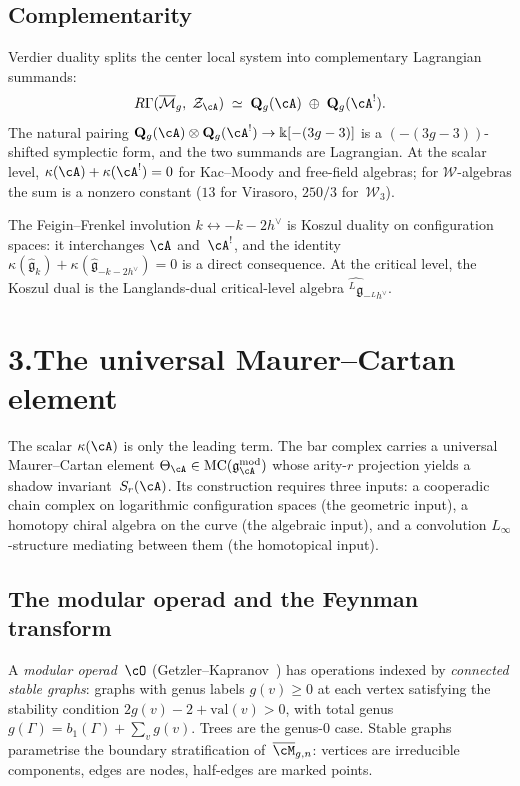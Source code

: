 \subsection*{Complementarity}

Verdier duality splits the center local system into complementary
Lagrangian summands:
\[
R\Gamma(\overline{\mathcal M}_g,\;\mathcal Z_\cA)
\;\simeq\;
\mathbf Q_g(\cA)\;\oplus\;\mathbf Q_g(\cA^!).
\]
The natural pairing
$\mathbf Q_g(\cA)\otimes\mathbf Q_g(\cA^!)
\to\Bbbk[-(3g-3)]$
is a $(-(3g-3))$-shifted symplectic form, and the two summands
are Lagrangian.
At the scalar level, $\kappa(\cA)+\kappa(\cA^!)=0$
for Kac--Moody and free-field algebras; for $\mathcal W$-algebras
the sum is a nonzero constant ($13$ for Virasoro,
$250/3$ for~$\mathcal{W}_3$).

The Feigin--Frenkel involution $k\leftrightarrow -k-2h^\vee$
is Koszul duality on configuration spaces: it interchanges
$\cA$ and~$\cA^!$, and the identity
$\kappa(\widehat{\mathfrak g}_k)+
\kappa(\widehat{\mathfrak g}_{-k-2h^\vee})=0$
is a direct consequence. At the critical level, the Koszul dual
is the Langlands-dual critical-level algebra
$\widehat{{}^L\mathfrak g}_{-{}^Lh^\vee}$.


\section*{3.\quad The universal Maurer--Cartan element}

The scalar $\kappa(\cA)$ is only the leading term. The bar complex
carries a universal Maurer--Cartan element
$\Theta_\cA\in\mathrm{MC}(\mathfrak g^{\mathrm{mod}}_\cA)$
whose arity-$r$ projection yields a shadow invariant~$S_r(\cA)$.
Its construction requires three inputs: a
cooperadic chain complex on logarithmic configuration spaces (the
geometric input), a homotopy chiral algebra on the curve (the
algebraic input), and a convolution $L_\infty$-structure mediating
between them (the homotopical input).

\subsection*{The modular operad and the Feynman transform}

A \emph{modular operad}~$\cO$
(Getzler--Kapranov~\cite{GeK98}) has operations indexed
by \emph{connected stable graphs}: graphs with genus labels
$g(v)\ge 0$ at each vertex satisfying the stability condition
$2g(v)-2+\mathrm{val}(v)>0$, with total genus
$g(\Gamma)=b_1(\Gamma)+\sum_v g(v)$.
Trees are the genus-$0$ case. Stable graphs parametrise
the boundary stratification of~$\overline{\cM}_{g,n}$:
vertices are irreducible components, edges are nodes,
half-edges are marked points.

